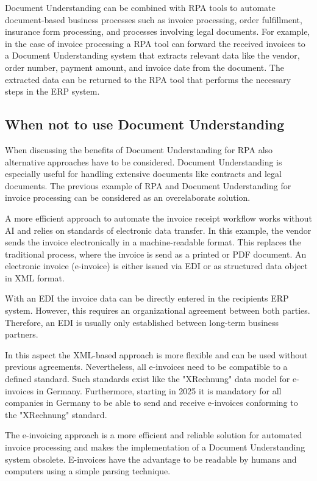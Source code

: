 Document Understanding can be combined with \ac{RPA} tools to automate document-based business processes such as invoice processing, order fulfillment, insurance form processing, and processes involving legal documents. For example, in the case of invoice processing a \ac{RPA} tool can forward the received invoices to a Document Understanding system that extracts relevant data like the vendor, order number, payment amount, and invoice date from the document. The extracted data can be returned to the \ac{RPA} tool that performs the necessary steps in the \ac{ERP} system.
\cite{leiAI,van2018robotic}

\subsection{When not to use Document Understanding}
When discussing the benefits of Document Understanding for \ac{RPA} also alternative approaches have to be considered. Document Understanding is especially useful for handling extensive documents like contracts and legal documents.
The previous example of \ac{RPA} and Document Understanding for invoice processing can be considered as an overelaborate solution. \cite{leiAI}

A more efficient approach to automate the invoice receipt workflow works without \ac{AI} and relies on standards of electronic data transfer. In this example, the vendor sends the invoice electronically in a machine-readable format. This replaces the traditional process, where the invoice is send as a printed or PDF document. An electronic invoice (e-invoice) is either issued via \ac{EDI} or as structured data object in XML format. \cite{alt2002integrierte,XRechnung}

With an \ac{EDI} the invoice data can be directly entered in the recipients \ac{ERP} system. However, this requires an organizational agreement between both parties. Therefore, an \ac{EDI} is usually only established between long-term business partners. \cite{alt2002integrierte,au2001should}

In this aspect the XML-based approach is more flexible and can be used without previous agreements. Nevertheless, all e-invoices need to be compatible to a defined standard. Such standards exist like the "XRechnung" data model for e-invoices in Germany. Furthermore, starting in 2025 it is mandatory for all companies in Germany to be able to send and receive e-invoices conforming to the "XRechnung" standard. \cite{XRechnung}

The e-invoicing approach is a more efficient and reliable solution for automated invoice processing and makes the implementation of a Document Understanding system obsolete. E-invoices have the advantage to be readable by humans and computers using a simple parsing technique.
\cite{alt2002integrierte,au2001should}